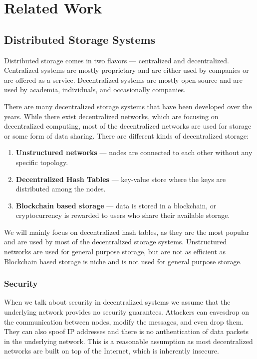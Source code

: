 \chapter{Related Work}
\label{chapter:related-work}

\section{Distributed Storage Systems}
\label{section:distributed-storage}

Distributed storage comes in two flavors --- centralized and decentralized.
Centralized systems are mostly proprietary and are either used by companies or are offered as a service.
Decentralized systems are mostly open-source and are used by academia, individuals, and occasionally companies.

There are many decentralized storage systems that have been developed over the years.
While there exist decentralized networks, which are focusing on decentralized computing,
most of the decentralized networks are used for storage or some form of data sharing.
There are different kinds of decentralized storage:
\begin{enumerate}
    \item \textbf{Unstructured networks} --- nodes are connected to each other without any specific topology.
    \item \textbf{Decentralized Hash Tables} --- key-value store where the keys are distributed among the nodes.
    \item \textbf{Blockchain based storage} --- data is stored in a blockchain, or cryptocurrency
        is rewarded to users who share their available storage.
\end{enumerate}

We will mainly focus on decentralized hash tables, as they are the most popular and are used by
most of the decentralized storage systems.
Unstructured networks are used for general purpose storage, but are not as efficient as 
Blockchain based storage is niche and is not used for general purpose storage.

\subsection{Security}
\label{subsection:security}

When we talk about security in decentralized systems we
assume that the underlying network provides no security guarantees.
Attackers can eavesdrop on the communication between nodes, modify the messages, and even drop them.
They can also spoof IP addresses and there is no authentication of data packets in the underlying network.
This is a reasonable assumption as most decentralized networks are built on top of the Internet,
which is inherently insecure.

